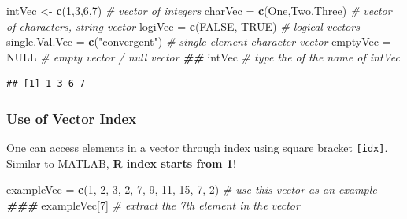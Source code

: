 \documentclass[
]{book}
\newenvironment{Shaded}{\begin{snugshade}}{\end{snugshade}}
\newcommand{\CommentTok}[1]{\textcolor[rgb]{0.56,0.35,0.01}{\textit{#1}}}
\newcommand{\ConstantTok}[1]{\textcolor[rgb]{0.56,0.35,0.01}{#1}}
\newcommand{\DecValTok}[1]{\textcolor[rgb]{0.00,0.00,0.81}{#1}}
\newcommand{\DocumentationTok}[1]{\textcolor[rgb]{0.56,0.35,0.01}{\textbf{\textit{#1}}}}
\newcommand{\FunctionTok}[1]{\textcolor[rgb]{0.13,0.29,0.53}{\textbf{#1}}}
\newcommand{\NormalTok}[1]{#1}
\newcommand{\OtherTok}[1]{\textcolor[rgb]{0.56,0.35,0.01}{#1}}
\newcommand{\StringTok}[1]{\textcolor[rgb]{0.31,0.60,0.02}{#1}}
\begin{document}
\begin{Shaded}
\begin{Highlighting}[]
\NormalTok{intVec }\OtherTok{\textless{}{-}} \FunctionTok{c}\NormalTok{(}\DecValTok{1}\NormalTok{,}\DecValTok{3}\NormalTok{,}\DecValTok{6}\NormalTok{,}\DecValTok{7}\NormalTok{)                  }\CommentTok{\# vector of integers}
\NormalTok{charVec }\OtherTok{=} \FunctionTok{c}\NormalTok{(}\StringTok{\textquotesingle{}One\textquotesingle{}}\NormalTok{,}\StringTok{\textquotesingle{}Two\textquotesingle{}}\NormalTok{,}\StringTok{\textquotesingle{}Three\textquotesingle{}}\NormalTok{)      }\CommentTok{\# vector of characters, string vector}
\NormalTok{logiVec }\OtherTok{=} \FunctionTok{c}\NormalTok{(}\ConstantTok{FALSE}\NormalTok{, }\ConstantTok{TRUE}\NormalTok{)              }\CommentTok{\# logical vectors}
\NormalTok{single.Val.Vec }\OtherTok{=} \FunctionTok{c}\NormalTok{(}\StringTok{"convergent"}\NormalTok{)      }\CommentTok{\# single element character vector}
\NormalTok{emptyVec }\OtherTok{=} \ConstantTok{NULL}                       \CommentTok{\# empty vector / null vector }
\DocumentationTok{\#\# }
\NormalTok{intVec                                }\CommentTok{\# type the of the name of intVec}
\end{Highlighting}
\end{Shaded}

\begin{verbatim}
## [1] 1 3 6 7
\end{verbatim}

\hypertarget{use-of-vector-index}{%
\subsubsection{Use of Vector Index}\label{use-of-vector-index}}

One can access elements in a vector through index using square bracket \texttt{{[}idx{]}}. Similar to MATLAB, \textbf{R index starts from 1}!

\begin{Shaded}
\begin{Highlighting}[]
\NormalTok{exampleVec }\OtherTok{=} \FunctionTok{c}\NormalTok{(}\DecValTok{1}\NormalTok{, }\DecValTok{2}\NormalTok{, }\DecValTok{3}\NormalTok{, }\DecValTok{2}\NormalTok{, }\DecValTok{7}\NormalTok{, }\DecValTok{9}\NormalTok{, }\DecValTok{11}\NormalTok{, }\DecValTok{15}\NormalTok{, }\DecValTok{7}\NormalTok{, }\DecValTok{2}\NormalTok{)  }\CommentTok{\# use this vector as an example}
\DocumentationTok{\#\#\#}
\NormalTok{exampleVec[}\DecValTok{7}\NormalTok{]            }\CommentTok{\# extract the 7th element in the vector}
\end{Highlighting}
\end{Shaded}
\end{document}
